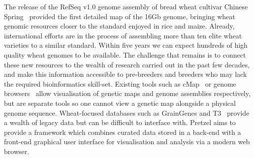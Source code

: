 \documentclass{bioinfo}
\begin{document}
The release of the RefSeq v1.0 genome assembly of bread wheat cultivar Chinese Spring~\citep{IWGSC2018} provided the first detailed map of the 16Gb genome, bringing wheat genomic resources closer to the standard enjoyed in rice and maize. 
Already, international efforts are in the process of assembling more than ten elite wheat varieties to a similar standard. 
Within five years we can expect hundreds of high quality wheat genomes to be available. 
The challenge that remains is to connect these new resources to the wealth of research carried out in the past few decades, and make this information accessible to pre-breeders and breeders who may lack the required bioinformatics skill-set.
Existing tools such as cMap~\citep{fang2003cmap} or genome browsers~\citep{Stein2013GBrowse,Buels2016JBrowse} allow visualisation of genetic maps and genome assemblies respectively, but are separate tools so one cannot view a genetic map alongside a physical genome sequence. 
Wheat-focused databases such as GrainGenes and T3~\citep{Blake2016T3} provide a wealth of legacy data but can be difficult to interface with. 
Pretzel aims to provide a framework which combines curated data stored in a back-end with a front-end graphical user interface for visualisation and analysis via a modern web browser. 
\end{document}
